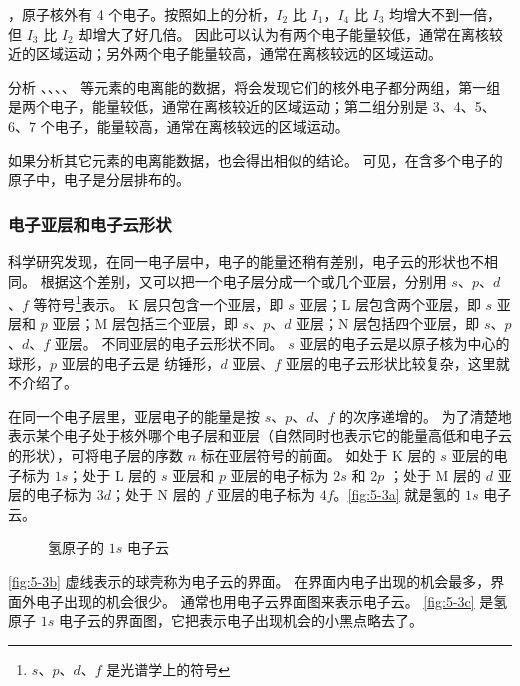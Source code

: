 ，原子核外有 4 个电子。按照如上的分析，$I_2$ 比 $I_1$，$I_4$ 比 $I_3$ 均增大不到一倍，但 $I_3$ 比 $I_2$ 却增大了好几倍。
因此可以认为有两个电子能量较低，通常在离核较近的区域运动；另外两个电子能量较高，通常在离核较远的区域运动。

分析 、、、、 等元素的电离能的数据，将会发现它们的核外电子都分两组，第一组是两个电子，能量较低，通常在离核较近的区域运动；第二组分别是 3、4、5、6、7 个电子，能量较高，通常在离核较远的区域运动。

如果分析其它元素的电离能数据，也会得出相似的结论。 
可见，在含多个电子的原子中，电子是分层排布的。

\subsubsection{电子亚层和电子云形状}
科学研究发现，在同一电子层中，电子的能量还稍有差别，电子云的形状也不相同。
根据这个差别，又可以把一个电子层分成一个或几个亚层，分别用 $s$、$p$、$d$、$f$ 等符号\footnote{$s$、$p$、$d$、$f$ 是光谱学上的符号}表示。
K 层只包含一个亚层，即 $s$ 亚层；L 层包含两个亚层，即 $s$ 亚层和 $p$ 亚层；M 层包括三个亚层，即 $s$、$p$、$d$ 亚层；N 层包括四个亚层，即 $s$、$p$、$d$、$f$ 亚层。
不同亚层的电子云形状不同。
$s$ 亚层的电子云是以原子核为中心的球形，$p$ 亚层的电子云是 纺锤形，$d$ 亚层、$f$ 亚层的电子云形状比较复杂，这里就不介绍了。

在同一个电子层里，亚层电子的能量是按 $s$、$p$、$d$、$f$ 的次序递增的。
为了清楚地表示某个电子处于核外哪个电子层和亚层（自然同时也表示它的能量高低和电子云的形状），可将电子层的序数 $n$ 标在亚层符号的前面。
如处于 K 层的 $s$ 亚层的电子标为 $1s$；处于 L 层的 $s$ 亚层和 $p$ 亚层的电子标为 $2s$ 和 $2p$ ；处于 M 层的 $d$ 亚层的电子标为 $3d$；处于 N 层的 $f$ 亚层的电子标为 $4f$。\cref{fig:5-3a} 就是氢的 $1s$ 电子云。
\begin{figure}
  \begin{minipage}{0.32\linewidth}\centering
    \subcaption{}\label{fig:5-3a}
  \end{minipage}
  \begin{minipage}{0.32\linewidth}\centering
    \subcaption{}\label{fig:5-3b}
  \end{minipage}
  \begin{minipage}{0.32\linewidth}\centering
    \subcaption{}\label{fig:5-3c}
  \end{minipage}
  \caption{氢原子的 $1s$ 电子云}\label{fig:5-3}
\end{figure}

\cref{fig:5-3b} 虚线表示的球壳称为电子云的界面。
在界面内电子出现的机会最多，界面外电子出现的机会很少。
通常也用电子云界面图来表示电子云。
\cref{fig:5-3c} 是氢原子 \({1s}\) 电子云的界面图，它把表示电子出现机会的小黑点略去了。

